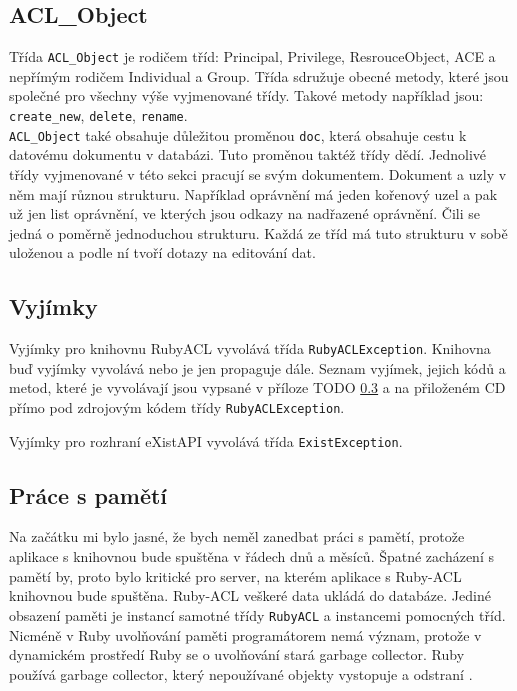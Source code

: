 \subsection{ACL\_Object}
Třída \verb|ACL_Object| je rodičem tříd: Principal, Privilege, ResrouceObject, ACE a nepřímým rodičem Individual a Group.
Třída sdružuje obecné metody, které jsou společné pro všechny výše vyjmenované třídy. Takové metody například jsou: \verb|create_new|, \verb|delete|, \verb|rename|. \\ \verb|ACL_Object| také obsahuje důležitou proměnou \verb|doc|, která obsahuje cestu k datovému dokumentu v databázi. Tuto proměnou taktéž třídy dědí.
Jednolivé třídy vyjmenované v této sekci pracují se svým dokumentem. Dokument a uzly v něm mají různou strukturu. Například oprávnění má jeden kořenový uzel a pak už jen list oprávnění, ve kterých jsou odkazy na nadřazené oprávnění. Čili se jedná o poměrně jednoduchou strukturu. Každá ze tříd má tuto strukturu v sobě uloženou a podle ní tvoří dotazy na editování dat.


\subsection{Vyjímky}
Vyjímky pro knihovnu RubyACL vyvolává třída \verb|RubyACLException|. Knihovna buď vyjímky vyvolává nebo je jen propaguje dále. Seznam vyjímek, jejich kódů a metod, které je vyvolávají jsou vypsané v příloze TODO \ref{} a na přiloženém CD přímo pod zdrojovým kódem třídy \verb|RubyACLException|.

Vyjímky pro rozhraní eXistAPI vyvolává třída \verb|ExistException|.


\subsection{Práce s pamětí}
Na začátku mi bylo jasné, že bych neměl zanedbat práci s pamětí, protože aplikace s knihovnou bude spuštěna v řádech dnů a měsíců. Špatné zacházení s pamětí by, proto bylo kritické pro server, na kterém aplikace s Ruby-ACL knihovnou bude spuštěna. Ruby-ACL veškeré data ukládá do databáze. Jediné obsazení paměti je instancí samotné třídy \verb|RubyACL| a instancemi pomocných tříd. Nicméně v Ruby uvolňování paměti programátorem nemá význam, protože v dynamickém prostředí Ruby se o uvolňování stará garbage collector. Ruby používá garbage collector, který nepoužívané objekty vystopuje a odstraní \cite{Ruby}.